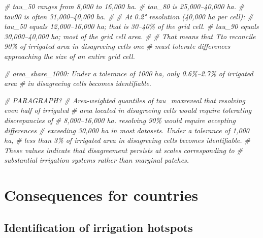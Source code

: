 \documentclass[
  11pt,
]{article}
\newenvironment{Shaded}{\begin{snugshade}}{\end{snugshade}}
\newcommand{\CommentTok}[1]{\textcolor[rgb]{0.56,0.35,0.01}{\textit{#1}}}
\begin{document}
\begin{Shaded}
\begin{Highlighting}[]
\CommentTok{\# tau\_50 ranges from 8,000 to 16,000 ha.}
\CommentTok{\# tau\_80 is 25,000–40,000 ha.}
\CommentTok{\# tau90 is often 31,000–40,000 ha.}
\CommentTok{\#}
\CommentTok{\# At 0.2° resolution (40,000 ha per cell):}
\CommentTok{\# tau\_50 equals 12,000–16,000 ha; that is 30–40\% of the grid cell.}
\CommentTok{\# tau\_90 equals 30,000–40,000 ha; most of the grid cell area.}
\CommentTok{\#}
\CommentTok{\# That means that Tto reconcile 90\% of irrigated area in disagreeing cells one}
\CommentTok{\# must tolerate differences approaching the size of an entire grid cell.}

\CommentTok{\# area\_share\_1000: Under a tolerance of 1000 ha, only 0.6\%–2.7\% of irrigated area}
\CommentTok{\# in disagreeing cells becomes identifiable.}

\CommentTok{\# PARAGRAPH?}
\CommentTok{\# Area{-}weighted quantiles of tau\_maxreveal that resolving even half of irrigated}
\CommentTok{\# area located in disagreeing cells would require tolerating discrepancies of}
\CommentTok{\# 8,000–16,000 ha. resolving 90\% would require accepting differences}
\CommentTok{\# exceeding 30,000 ha in most datasets. Under a tolerance of 1,000 ha,}
\CommentTok{\# less than 3\% of irrigated area in disagreeing cells becomes identifiable.}
\CommentTok{\# These values indicate that disagreement persists at scales corresponding to}
\CommentTok{\# substantial irrigation systems rather than marginal patches.}
\end{Highlighting}
\end{Shaded}

\section{Consequences for countries}\label{consequences-for-countries}

\subsection{Identification of irrigation
hotspots}\label{identification-of-irrigation-hotspots}
\end{document}
